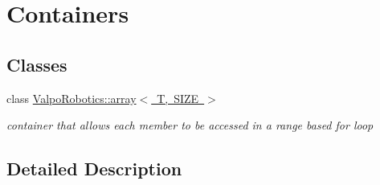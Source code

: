 \hypertarget{group___containers}{}\section{Containers}
\label{group___containers}
\subsection*{Classes}
\begin{DoxyCompactItemize}
\item 
class \mbox{\hyperlink{class_valpo_robotics_1_1array}{Valpo\+Robotics\+::array$<$ T, S\+I\+Z\+E $>$}}
\begin{DoxyCompactList}\small\item\em container that allows each member to be accessed in a range based for loop \end{DoxyCompactList}\end{DoxyCompactItemize}


\subsection{Detailed Description}

